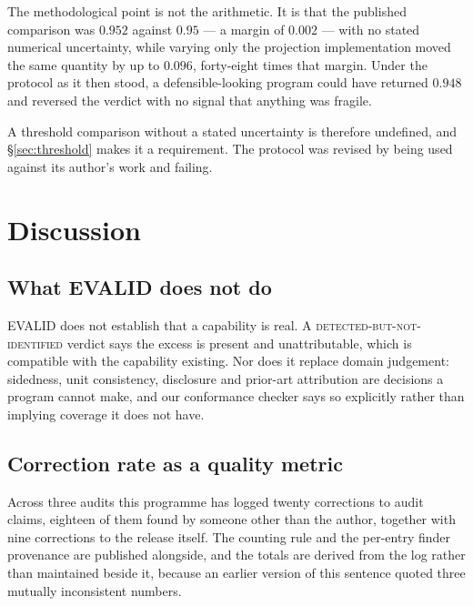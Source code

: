 \documentclass[11pt,a4paper]{article}
\newcommand{\verdict}[1]{\textsc{#1}}
\begin{document}
The methodological point is not the arithmetic. It is that the published
comparison was $0.952$ against $0.95$ --- a margin of $0.002$ --- with no
stated numerical uncertainty, while varying only the projection implementation
moved the same quantity by up to $0.096$, forty-eight times that margin. Under
the protocol as it then stood, a defensible-looking program could have returned
$0.948$ and reversed the verdict with no signal that anything was fragile.

A threshold comparison without a stated uncertainty is therefore undefined, and
\S\ref{sec:threshold} makes it a requirement. The protocol was revised by being
used against its author's work and failing.

\section{Discussion}
\label{sec:discussion}

\subsection{What EVALID does not do}

EVALID does not establish that a capability is real. A
\verdict{detected-but-not-identified} verdict says the excess is present and
unattributable, which is compatible with the capability existing. Nor does it
replace domain judgement: sidedness, unit consistency, disclosure and prior-art
attribution are decisions a program cannot make, and our conformance checker
says so explicitly rather than implying coverage it does not have.

\subsection{Correction rate as a quality metric}

Across three audits this programme has logged twenty corrections to audit
claims, eighteen of them found by someone other than the author, together with
nine corrections to the release itself. The counting rule and the per-entry
finder provenance are published alongside, and the totals are derived from the
log rather than maintained beside it, because an earlier version of this
sentence quoted three mutually inconsistent numbers.
\end{document}
